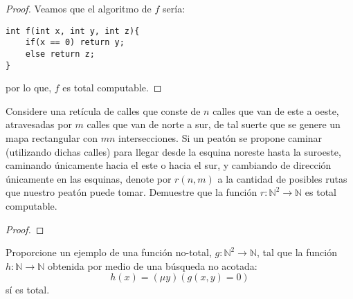 \documentclass[12pt]{report}
\newcounter{it}
\theoremstyle{largebreak}
\newcommand\cf[3]{\ensuremath{#1:#2\rightarrow#3}}
\begin{document}
    \begin{proof}
        Veamos que el algoritmo de $f$ sería:
        \begin{lstlisting}
int f(int x, int y, int z){
    if(x == 0) return y;
    else return z;
}
        \end{lstlisting}
        por lo que, $f$ es total computable.
    \end{proof}

    \begin{excer}
        Considere una retícula de calles que conste de $n$ calles que van de este a oeste, atravesadas por $m$ calles que van de norte a sur, de tal suerte que se genere un mapa rectangular con $mn$ intersecciones. Si un peatón se propone caminar (utilizando dichas calles) para llegar desde la esquina noreste hasta la suroeste, caminando únicamente hacia el este o hacia el sur, y cambiando de dirección únicamente en las esquinas, denote por $r(n,m)$ a la cantidad de posibles rutas que nuestro peatón puede tomar. Demuestre que la función $\cf{r}{\mathbb{N}^2}{\mathbb{N}}$ es total computable.
    \end{excer}

    \begin{proof}
        
    \end{proof}

    \begin{excer}
        Proporcione un ejemplo de una función no-total, $\cf{g}{\mathbb{N}^2}{\mathbb{N}}$, tal que la función $\cf{h}{\mathbb{N}}{\mathbb{N}}$ obtenida por medio de una búsqueda no acotada:
        \begin{equation*}
            h(x)=(\mu y)(g(x,y)=0)
        \end{equation*}
        sí es total.
    \end{excer}
\end{document}
